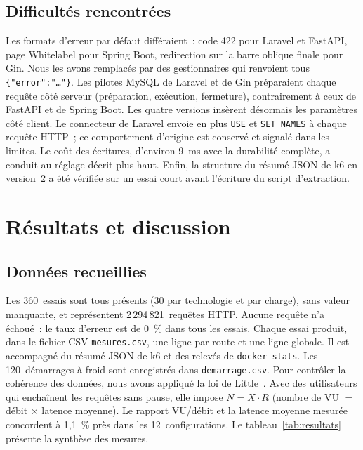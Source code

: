 \documentclass[conference,a4paper]{IEEEtran}
\begin{document}
\subsection{Difficultés rencontrées}
Les formats d'erreur par défaut différaient~: code 422 pour Laravel et
FastAPI, page \og Whitelabel \fg{} pour Spring Boot, redirection sur la
barre oblique finale pour Gin. Nous les avons remplacés par des
gestionnaires qui renvoient tous \texttt{\{"error":"\ldots"\}}. Les
pilotes MySQL de Laravel et de Gin préparaient chaque requête côté
serveur (préparation, exécution, fermeture), contrairement à ceux de
FastAPI et de Spring Boot. Les quatre versions insèrent désormais les
paramètres côté client. Le connecteur de Laravel envoie en plus
\texttt{USE} et \texttt{SET NAMES} à chaque requête HTTP~; ce
comportement d'origine est conservé et signalé dans les limites. Le
coût des écritures, d'environ 9~ms avec la durabilité complète, a
conduit au réglage décrit plus haut. Enfin, la structure du résumé JSON
de k6 en version~2 a été vérifiée sur un essai court avant l'écriture
du script d'extraction.

\section{Résultats et discussion}\label{sec:resultats}
\subsection{Données recueillies}
Les 360~essais sont tous présents (30 par technologie et par charge),
sans valeur manquante, et représentent 2\,294\,821~requêtes HTTP. Aucune
requête n'a échoué~: le taux d'erreur est de 0~\% dans tous les essais.
Chaque essai produit, dans le fichier CSV \texttt{mesures.csv}, une
ligne par route et une ligne globale. Il est accompagné du résumé JSON
de k6 et des relevés de \texttt{docker stats}. Les 120~démarrages à
froid sont enregistrés dans \texttt{demarrage.csv}. Pour contrôler la
cohérence des données, nous avons appliqué la loi de
Little~\cite{little}. Avec des utilisateurs qui enchaînent les requêtes
sans pause, elle impose $N = X \cdot R$ (nombre de VU $=$ débit
$\times$ latence moyenne). Le rapport VU/débit et la latence moyenne
mesurée concordent à 1,1~\% près dans les 12~configurations. Le
tableau~\ref{tab:resultats} présente la synthèse des mesures.
\end{document}
